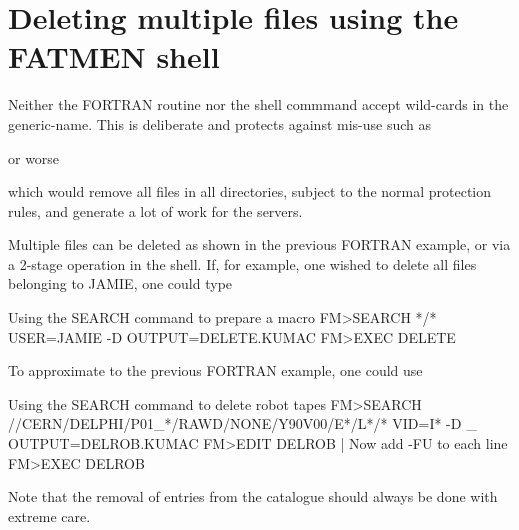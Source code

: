 \section{Deleting multiple files using the FATMEN shell}
\par
Neither the FORTRAN routine  nor the shell commmand 
accept wild-cards in the generic-name. This is deliberate
and protects against mis-use such as
\begin{XMP}

or worse

\end{XMP}
which would remove all files in all directories,
subject to the normal protection rules,  and generate
a lot of work for the servers.

Multiple files can be deleted as shown in the previous FORTRAN
example, or via a 2-stage operation in the shell.
If, for example, one wished to delete all files belonging to
JAMIE, one could type
\begin{XMPt}{Using the SEARCH command to prepare a macro}
FM>SEARCH */* USER=JAMIE -D OUTPUT=DELETE.KUMAC
FM>EXEC DELETE
\end{XMPt}
\par
To approximate to the previous FORTRAN example, one could use
\begin{XMPt}{Using the SEARCH command to delete robot tapes}
FM>SEARCH //CERN/DELPHI/P01_*/RAWD/NONE/Y90V00/E*/L*/* VID=I* -D _
   OUTPUT=DELROB.KUMAC
FM>EDIT DELROB | Now add -FU to each line
FM>EXEC DELROB
\end{XMPt}
\par
Note that the removal of entries from the catalogue should
always be done with extreme care.
 
